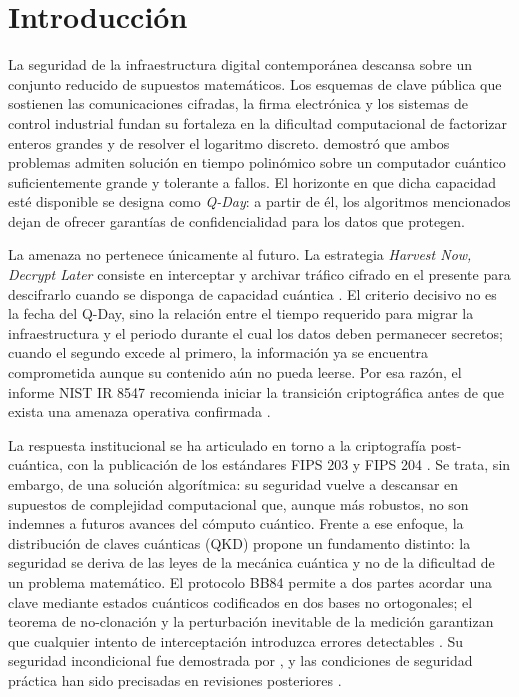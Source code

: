 \documentclass[conference]{IEEEtran}
\begin{document}
\section{Introducción}

La seguridad de la infraestructura digital contemporánea descansa sobre un
conjunto reducido de supuestos matemáticos. Los esquemas de clave pública que
sostienen las comunicaciones cifradas, la firma electrónica y los sistemas de
control industrial fundan su fortaleza en la dificultad computacional de
factorizar enteros grandes y de resolver el logaritmo discreto. \cite{shor1997}
demostró que ambos problemas admiten solución en tiempo polinómico sobre un
computador cuántico suficientemente grande y tolerante a fallos. El horizonte en
que dicha capacidad esté disponible se designa como \textit{Q-Day}: a partir de
él, los algoritmos mencionados dejan de ofrecer garantías de confidencialidad
para los datos que protegen.

La amenaza no pertenece únicamente al futuro. La estrategia \textit{Harvest Now,
Decrypt Later} consiste en interceptar y archivar tráfico cifrado en el presente
para descifrarlo cuando se disponga de capacidad cuántica \cite{mosca2018}. El
criterio decisivo no es la fecha del Q-Day, sino la relación entre el tiempo
requerido para migrar la infraestructura y el periodo durante el cual los datos
deben permanecer secretos; cuando el segundo excede al primero, la información ya
se encuentra comprometida aunque su contenido aún no pueda leerse. Por esa razón,
el informe NIST IR 8547 recomienda iniciar la transición criptográfica antes de
que exista una amenaza operativa confirmada \cite{regenscheid2026}.

La respuesta institucional se ha articulado en torno a la criptografía
post-cuántica, con la publicación de los estándares FIPS 203 y FIPS 204
\cite{nist2024a,nist2024b}. Se trata, sin embargo, de una solución algorítmica:
su seguridad vuelve a descansar en supuestos de complejidad computacional que,
aunque más robustos, no son indemnes a futuros avances del cómputo cuántico.
Frente a ese enfoque, la distribución de claves cuánticas (QKD) propone un
fundamento distinto: la seguridad se deriva de las leyes de la mecánica cuántica
y no de la dificultad de un problema matemático. El protocolo BB84
\cite{bennett1984} permite a dos partes acordar una clave mediante estados
cuánticos codificados en dos bases no ortogonales; el teorema de no-clonación y
la perturbación inevitable de la medición garantizan que cualquier intento de
interceptación introduzca errores detectables \cite{gisin2002}. Su seguridad
incondicional fue demostrada por \cite{shor2000}, y las condiciones de seguridad
práctica han sido precisadas en revisiones posteriores \cite{scarani2009,xu2020}.
\end{document}
